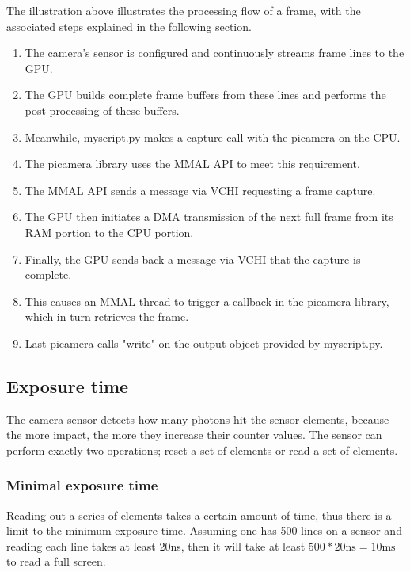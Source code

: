 \documentclass[12pt, a4paper]{report}
\begin{document}
    \bigskip
    
    The illustration above illustrates the processing flow of a frame, with the associated steps explained in the following section.
    
    \begin{enumerate}
    \item The camera's sensor is configured and continuously streams frame lines to the GPU.
    \item The GPU builds complete frame buffers from these lines and performs the post-processing of these buffers.
    \item Meanwhile, myscript.py makes a capture call with the picamera on the CPU.
    \item The picamera library uses the MMAL API to meet this requirement.
    \item The MMAL API sends a message via VCHI requesting a frame capture.
    \item The GPU then initiates a DMA transmission of the next full frame from its RAM portion to the CPU portion.
    \item Finally, the GPU sends back a message via VCHI that the capture is complete.
    \item This causes an MMAL thread to trigger a callback in the picamera library, which in turn retrieves the frame.
    \item Last picamera calls "write" on the output object provided by myscript.py.
    \end{enumerate}
    
    \subsection{Exposure time}
    
    The camera sensor detects how many photons hit the sensor elements, because the more impact, the more they increase their counter values. The sensor can perform exactly two operations; reset a set of elements or read a set of elements.
    
    \subsubsection{Minimal exposure time}
    
    Reading out a series of elements takes a certain amount of time, thus there is a limit to the minimum exposure time. Assuming one has 500 lines on a sensor and reading each line takes at least 20ns, then it will take at least $500*20 \text{ns} = 10 \text{ms}$ to read a full screen. 
    
\end{document}
